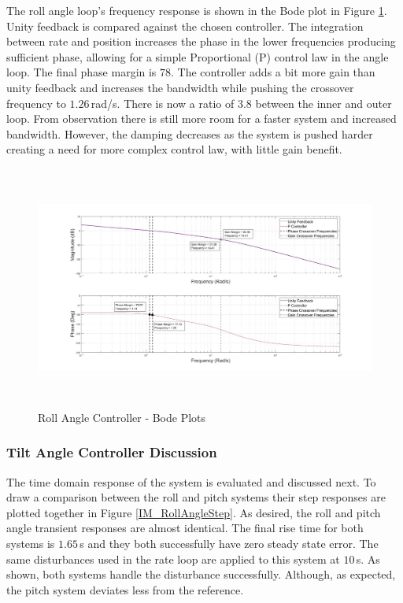 		The roll angle loop's frequency response is shown in the Bode plot in Figure \ref{IM_RollAngleControlBode}. Unity feedback is compared against the chosen controller. The integration between rate and position increases the phase in the lower frequencies producing sufficient phase, allowing for a simple Proportional (P) control law in the angle loop. The final phase margin is $78$\textdegree. The controller adds a bit more gain than unity feedback and increases the bandwidth while pushing the crossover frequency to $1.26$\,rad/s. There is now a ratio of $3.8$ between the inner and outer loop. From observation there is still more room for a faster system and increased bandwidth. However, the damping decreases as the system is pushed harder creating a need for more complex control law, with little gain benefit.
		
		\begin{figure}[H]
			\centering
			\includegraphics[height = 8cm]{../Design/Matlab/Controllers/roll_angle_bode.jpg}
			\caption{Roll Angle Controller -  Bode Plots}
			\label{IM_RollAngleControlBode}
		\end{figure}
	
		\subsubsection{Tilt Angle Controller Discussion}
		The time domain response of the system is evaluated and discussed next. To draw a comparison between the roll and pitch systems their step responses are plotted together in Figure \ref{IM_RollAngleStep}. As desired, the roll and pitch angle transient responses are almost identical. The final rise time for both systems is $1.65$\,s and they both successfully have zero steady state error. The same disturbances used in the rate loop are applied to this system at $10$\,s. As shown, both systems handle the disturbance successfully. Although, as expected, the pitch system deviates less from the reference.
		
